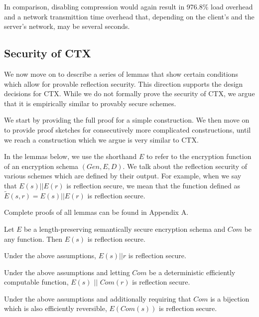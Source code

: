 In comparison, disabling compression would again result in 976.8\% load overhead
and a network transmittion time overhead that, depending on the client's and the
server's network, may be several seconds.

\subsection{Security of CTX}

We now move on to describe a series of lemmas that show certain conditions
which allow for provable reflection security. This direction supports
the design decisions for CTX. While we do not formally prove the security of
CTX, we argue that it is empirically similar to provably secure schemes.

We start by providing the full proof for a simple construction. We then move on
to provide proof sketches for consecutively more complicated constructions,
until we reach a construction which we argue is very similar to CTX.

In the lemmas below, we use the shorthand $E$ to refer to the encryption
function of an encryption schema $(Gen, E, D)$. We talk about the reflection
security of various schemes which are defined by their output. For example,
when we say that $E(s) || E(r)$ is reflection secure, we mean that the function
defined as $\widetilde{E}(s, r) = E(s) || E(r)$ is reflection secure.

Complete proofs of all lemmas can be found in Appendix A.

\begin{lemma}
    Let $E$ be a length-preserving semantically secure encryption schema and
    $Com$ be any function. Then $E(s)$ is reflection secure.
\end{lemma}

\begin{lemma}
    Under the above assumptions, $E(s) || r$ is reflection secure.
\end{lemma}

\begin{lemma}
    Under the above assumptions and letting $Com$ be a deterministic
    efficiently computable function, $E(s)$ $||$ $Com(r)$ is reflection secure.
\end{lemma}

\begin{lemma}
    Under the above assumptions and additionally requiring that $Com$ is a
    bijection which is also efficiently reversible, $E(Com(s))$ is reflection secure.
\end{lemma}

